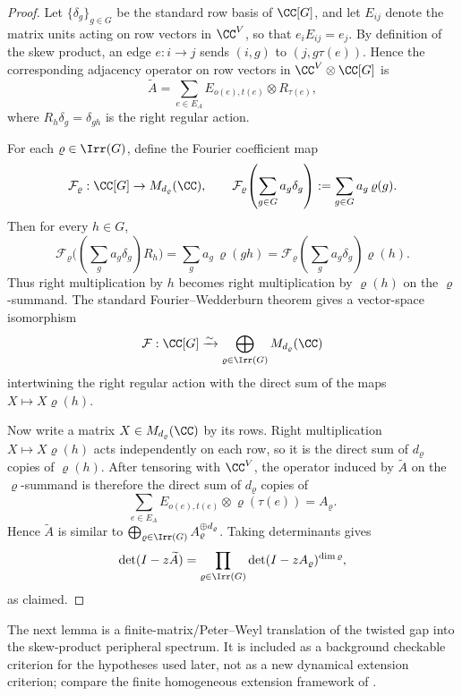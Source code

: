 \begin{proof}
  Let \(\{\delta_g\}_{g\in G}\) be the standard row basis of \(\CC[G]\),
  and let \(E_{ij}\) denote the matrix units acting on row vectors in
  \(\CC^V\), so that \(e_iE_{ij}=e_j\). By definition of the skew
  product, an edge \(e:i\to j\) sends \((i,g)\) to \((j,g\tau(e))\).
  Hence the corresponding adjacency operator on row vectors in
  \(\CC^V\otimes\CC[G]\) is
  \[
    \widetilde A
    =
    \sum_{e\in E_A} E_{o(e),t(e)}\otimes R_{\tau(e)},
  \]
  where \(R_h\delta_g=\delta_{gh}\) is the right regular action.

  For each \(\varrho\in\Irr(G)\), define the Fourier coefficient map
  \[
    \mathcal F_\varrho:\CC[G]\to M_{d_\varrho}(\CC),
    \qquad
    \mathcal F_\varrho\!\left(\sum_{g\in G}a_g\delta_g\right)
    :=\sum_{g\in G}a_g\,\varrho(g).
  \]
  Then for every \(h\in G\),
  \[
    \mathcal F_\varrho\bigl((\sum_g a_g\delta_g)R_h\bigr)
    =\sum_g a_g\,\varrho(gh)
    =\mathcal F_\varrho\!\left(\sum_g a_g\delta_g\right)\varrho(h).
  \]
  Thus right multiplication by \(h\) becomes right multiplication by
  \(\varrho(h)\) on the \(\varrho\)-summand. The standard
  Fourier--Wedderburn theorem gives a vector-space isomorphism
  \[
    \mathcal F:\CC[G]\xrightarrow{\sim}
    \bigoplus_{\varrho\in\Irr(G)}M_{d_\varrho}(\CC)
  \]
  intertwining the right regular action with the direct sum of the maps
  \(X\mapsto X\varrho(h)\).

  Now write a matrix \(X\in M_{d_\varrho}(\CC)\) by its rows. Right
  multiplication \(X\mapsto X\varrho(h)\) acts independently on each row,
  so it is the direct sum of \(d_\varrho\) copies of \(\varrho(h)\). After
  tensoring with \(\CC^V\), the operator induced by \(\widetilde A\) on
  the \(\varrho\)-summand is therefore the direct sum of \(d_\varrho\)
  copies of
  \[
    \sum_{e\in E_A} E_{o(e),t(e)}\otimes \varrho(\tau(e))
    =
    A_\varrho.
  \]
  Hence \(\widetilde A\) is similar to
  \(\bigoplus_{\varrho\in\Irr(G)}A_\varrho^{\oplus d_\varrho}\). Taking
  determinants gives
  \[
    \det(I-z\widetilde A)
    =
    \prod_{\varrho\in\Irr(G)}
      \det(I-zA_\varrho)^{\dim\varrho},
  \]
  as claimed.
\end{proof}

The next lemma is a finite-matrix/Peter--Weyl translation of the twisted gap
into the skew-product peripheral spectrum.  It is included as a background
checkable criterion for the hypotheses used later, not as a new dynamical
extension criterion; compare the finite homogeneous extension framework of
\cite{Noorani1997HomogeneousExtensionsMarkov,NooraniParry1992ChebotarevShifts}.

